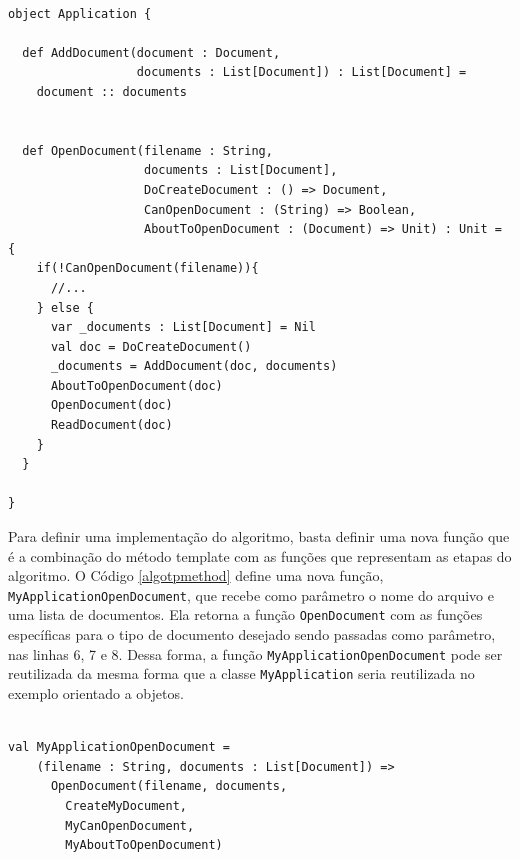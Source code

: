 \begin{lstlisting}[caption={\textit{Template Method} Funcional.},label=fptpmethod]
    
object Application {

  def AddDocument(document : Document,
                  documents : List[Document]) : List[Document] =
    document :: documents


  def OpenDocument(filename : String,
                   documents : List[Document],
                   DoCreateDocument : () => Document,
                   CanOpenDocument : (String) => Boolean,
                   AboutToOpenDocument : (Document) => Unit) : Unit = {
    if(!CanOpenDocument(filename)){
      //...
    } else {
      var _documents : List[Document] = Nil
      val doc = DoCreateDocument()
      _documents = AddDocument(doc, documents)
      AboutToOpenDocument(doc)
      OpenDocument(doc)
      ReadDocument(doc)
    }
  }

}

\end{lstlisting}

Para definir uma implementação do algoritmo, basta 
definir uma nova função que é a combinação do método 
template com as funções que representam as etapas do 
algoritmo. O Código \ref{algotpmethod} define uma 
nova função, \texttt{MyApplicationOpenDocument}, que recebe 
como parâmetro o nome do arquivo e uma lista de 
documentos. Ela retorna a função \texttt{OpenDocument} com as 
funções específicas para o tipo de documento 
desejado sendo passadas como parâmetro, nas linhas 
6, 7 e 8. Dessa forma, a função \texttt{MyApplicationOpenDocument} 
pode ser reutilizada da mesma forma que a classe 
\texttt{MyApplication} seria reutilizada no exemplo orientado 
a objetos.

\begin{lstlisting}[caption={Definição do algoritmo.},label=algotpmethod]
    
val MyApplicationOpenDocument = 
    (filename : String, documents : List[Document]) => 
      OpenDocument(filename, documents,
        CreateMyDocument,
        MyCanOpenDocument,
        MyAboutToOpenDocument)

\end{lstlisting}


